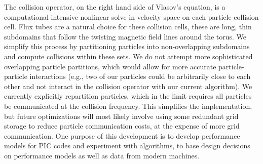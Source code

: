 \documentclass[review]{siamart}
\begin{document}
The collision operator, on the right hand side of Vlasov's equation, is a computational intensive nonlinear solve in velocity space on each particle collision cell.
Flux tubes are a natural choice for these collision cells, these are long, thin subdomains that follow the twisting magnetic field lines around the torus.
We simplify this process by partitioning particles into non-overlapping subdomains and compute collisions within these sets.
We do not attempt more sophisticated overlapping particle partitions, which would allow for more accurate particle-particle interactions (e.g., two of our particles could be arbitrarily close to each other and not interact in the collision operator with our current algorithm).
We currently explicitly repartition particles, which in the limit requires all particles be communicated at the collision frequency.
This simplifies the implementation, but future optimizations will most likely involve using some redundant grid storage to reduce particle communication costs, at the expense of more grid communication.
One purpose of this development is to develop performance models for PIC codes and experiment with algorithms, to base design decisions on performance models as well as data from modern machines.
\end{document}
